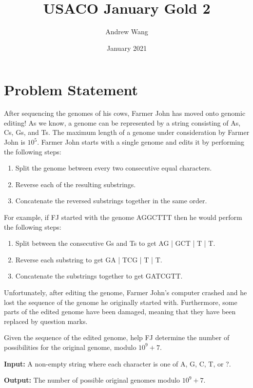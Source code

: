 \documentclass{article}
\title{USACO January Gold 2}
\author{Andrew Wang}
\date{January 2021}
\begin{document}
\maketitle

\section{Problem Statement}
    \hspace{1em} \quad After sequencing the genomes of his cows, Farmer John has moved onto genomic editing! As we know, a genome can be represented by a string consisting of As, Cs, Gs, and Ts. The maximum length of a genome under consideration by Farmer John is $10^5$.
    Farmer John starts with a single genome and edits it by performing the following steps:
    \begin{enumerate}
    \item Split the genome between every two consecutive equal characters.
    \item Reverse each of the resulting substrings.
    \item Concatenate the reversed substrings together in the same order.
    \end{enumerate}
    For example, if FJ started with the genome AGGCTTT then he would perform the following steps:
    \begin{enumerate}
    \item Split between the consecutive Gs and Ts to get AG | GCT | T | T.
    \item Reverse each substring to get GA | TCG | T | T.
    \item Concatenate the substrings together to get GATCGTT.
    \end{enumerate}
    Unfortunately, after editing the genome, Farmer John's computer crashed and he lost the sequence of the genome he originally started with. Furthermore, some parts of the edited genome have been damaged, meaning that they have been replaced by question marks.
    
    Given the sequence of the edited genome, help FJ determine the number of possibilities for the original genome, modulo $10^9+7$.
    
    \textbf{Input:}
    A non-empty string where each character is one of A, G, C, T, or ?.
    
    \textbf{Output:}
    The number of possible original genomes modulo $10^9+7$.
\vspace{6mm}
\end{document}
